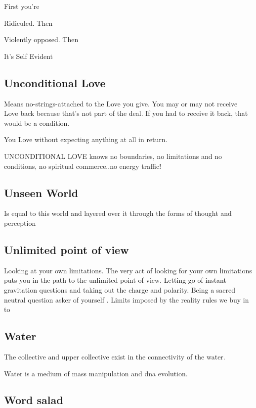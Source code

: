 First you're

Ridiculed. Then

Violently opposed. Then

It's Self Evident

\subsection{Unconditional Love}\label{unconditional-love}

Means no-strings-attached to the Love you give. You may or may not
receive Love back because that's not part of the deal. If you had to
receive it back, that would be a condition.

You Love without expecting anything at all in return.

UNCONDITIONAL LOVE knows no boundaries, no limitations and no
conditions, no spiritual commerce..no energy traffic!

\subsection{Unseen World}\label{unseen-world}

Is equal to this world and layered over it through the forms of thought
and perception

\subsection{Unlimited point of view}\label{unlimited-point-of-view}

Looking at your own limitations. The very act of looking for your own
limitations puts you in the path to the unlimited point of view. Letting
go of instant gravitation questions and taking out the charge and
polarity. Being a sacred neutral question asker of yourself . Limits
imposed by the reality rules we buy in to

\subsection{Water}\label{water}

The collective and upper collective exist in the connectivity of the
water.

Water is a medium of mass manipulation and dna evolution.

\subsection{Word salad}\label{word-salad}

